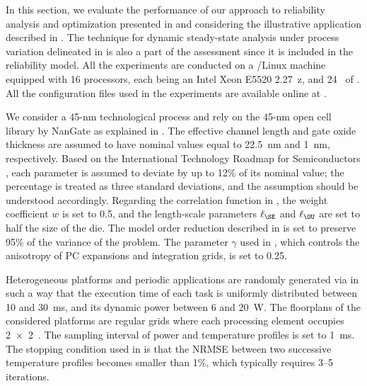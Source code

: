In this section, we evaluate the performance of our approach to reliability
analysis and optimization presented in  and
 considering the illustrative application described in
. The technique for dynamic steady-state
analysis under process variation delineated in
 is also a part of the assessment since it
is included in the reliability model. All the experiments are conducted on a
/Linux machine equipped with 16 processors, each being an Intel Xeon
E5520 2.27~z, and 24~ of . All the configuration files
used in the experiments are available online at \cite{eslab2015}.

We consider a 45-nm technological process and rely on the 45-nm open cell
library by NanGate \cite{nangate} as explained in
. The effective channel length and gate
oxide thickness are assumed to have nominal values equal to 22.5~nm and 1~nm,
respectively. Based on the International Technology Roadmap for Semiconductors
\cite{itrs}, each parameter is assumed to deviate by up to 12\% of its nominal
value; the percentage is treated as three standard deviations, and the
assumption should be understood accordingly. Regarding the correlation function
in , the weight coefficient $w$ is set to 0.5, and the
length-scale parameters $\ell_\SE$ and $\ell_\OU$ are set to half the size of
the die. The model order reduction described in
 is set to preserve 95\% of the variance of the
problem. The parameter $\gamma$ used in , which
controls the anisotropy of \ac{PC} expansions and integration grids, is set to
0.25.

Heterogeneous platforms and periodic applications are randomly generated via
 \cite{dick1998} in such a way that the execution time of each task is
uniformly distributed between 10 and 30~ms, and its dynamic power between 6 and
20~W. The floorplans of the considered platforms are regular grids where each
processing element occupies 2~×~2~. The sampling interval \dt of
power and temperature profiles is set to 1~ms. The stopping condition used in
 is that the \ac{NRMSE} between
two successive temperature profiles becomes smaller than 1\%, which typically
requires 3--5 iterations.


